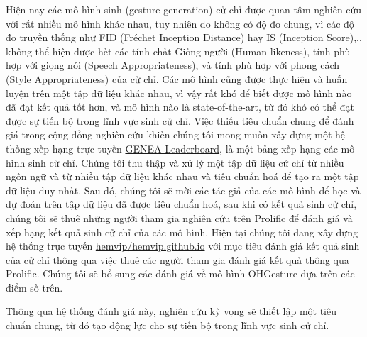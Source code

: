 Hiện nay các mô hình sinh (gesture generation) cử chỉ được quan tâm nghiên cứu với rất nhiều mô hình khác nhau, tuy nhiên do không có độ đo chung, vì các độ đo truyền thống như FID (Fréchet Inception Distance) hay IS (Inception Score),.. không thể hiện được hết các tính chất Giống người (Human-likeness), tính phù hợp với giọng nói (Speech Appropriateness), và tính phù hợp với phong cách (Style Appropriateness) của cử chỉ. Các mô hình cũng được thực hiện và huấn luyện trên một tập dữ liệu khác nhau, vì vậy rất khó để biết được mô hình nào đã đạt kết quả tốt hơn, và mô hình nào là state-of-the-art, từ đó khó có thể đạt được sự tiến bộ trong lĩnh vực sinh cử chỉ. Việc thiếu tiêu chuẩn chung để đánh giá trong cộng đồng nghiên cứu khiến chúng tôi mong muốn xây dựng một hệ thống xếp hạng trực tuyến \cite{nagy2024towards} \hyperlink{https://genea-workshop.github.io/leaderboard/}{GENEA Leaderboard}, là một bảng xếp hạng các mô hình sinh cử chỉ. Chúng tôi thu thập và xử lý một tập dữ liệu cử chỉ từ nhiều ngôn ngữ và từ nhiều tập dữ liệu khác nhau và tiêu chuẩn hoá để tạo ra một tập dữ liệu duy nhất.  Sau đó, chúng tôi sẽ mời các tác giả của các mô hình để học và dự đoán trên tập dữ liệu đã được tiêu chuẩn hoá, sau khi có kết quả sinh cử chỉ, chúng tôi sẽ thuê những người tham gia nghiên cứu trên Prolific để đánh giá và xếp hạng kết quả sinh cử chỉ của các mô hình. Hiện tại chúng tôi đang xây dựng hệ thống trực tuyến \hyperlink{https://github.com/hemvip/hemvip.github.io}{hemvip/hemvip.github.io} với mục tiêu đánh giá kết quả sinh của cử chỉ thông qua việc thuê các người tham gia đánh giá kết quả thông qua Prolific. Chúng tôi sẽ bổ sung các đánh giá về mô hình OHGesture dựa trên các điểm số trên.

Thông qua hệ thống đánh giá này, nghiên cứu kỳ vọng sẽ thiết lập một tiêu chuẩn chung, từ đó tạo động lực cho sự tiến bộ trong lĩnh vực sinh cử chỉ.




